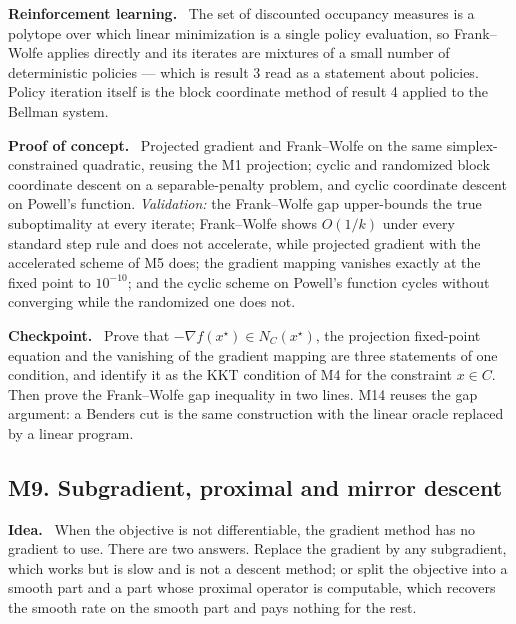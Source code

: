 \documentclass[11pt,a4paper]{article}
\newcommand{\mpart}[1]{\smallskip\noindent\textbf{#1}\ \ignorespaces}
\begin{document}
\mpart{Reinforcement learning.} The set of discounted occupancy measures is a polytope over
which linear minimization is a single policy evaluation, so Frank--Wolfe applies directly and
its iterates are mixtures of a small number of deterministic policies --- which is result 3
read as a statement about policies. Policy iteration itself is the block coordinate method of
result 4 applied to the Bellman system.

\mpart{Proof of concept.} Projected gradient and Frank--Wolfe on the same simplex-constrained
quadratic, reusing the M1 projection; cyclic and randomized block coordinate descent on a
separable-penalty problem, and cyclic coordinate descent on Powell's function.
\emph{Validation:} the Frank--Wolfe gap upper-bounds the true suboptimality at every iterate;
Frank--Wolfe shows $O(1/k)$ under every standard step rule and does not accelerate, while
projected gradient with the accelerated scheme of M5 does; the gradient mapping vanishes
exactly at the fixed point to $10^{-10}$; and the cyclic scheme on Powell's function cycles
without converging while the randomized one does not.

\mpart{Checkpoint.} Prove that $-\nabla f(x^\star)\in N_C(x^\star)$, the projection fixed-point
equation and the vanishing of the gradient mapping are three statements of one condition, and
identify it as the KKT condition of M4 for the constraint $x\in C$. Then prove the
Frank--Wolfe gap inequality in two lines. M14 reuses the gap argument: a Benders cut is the
same construction with the linear oracle replaced by a linear program.

\clearpage

\subsection{M9. Subgradient, proximal and mirror descent}

\mpart{Idea.} When the objective is not differentiable, the gradient method has no gradient to
use. There are two answers. Replace the gradient by any subgradient, which works but is slow
and is not a descent method; or split the objective into a smooth part and a part whose
proximal operator is computable, which recovers the smooth rate on the smooth part and pays
nothing for the rest.
\end{document}
